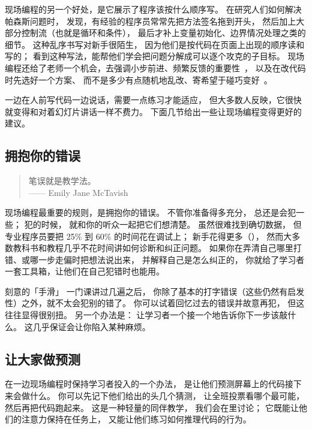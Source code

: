 现场编程的另一个好处，是它展示了程序该按什么顺序写。
在研究人们如何解决帕森斯问题时，
\cite{Ihan2011}发现，有经验的程序员常常先把方法签名拖到开头，
然后加上大部分控制流（也就是循环和条件），
最后才补上变量初始化、边界情况处理之类的细节。
这种乱序书写对新手很陌生，
因为他们是按代码在页面上出现的顺序读和写的；
看到这种写法，能帮他们学会把问题分解成可以逐个攻克的子目标。
现场编程还给了老师一个机会，去强调小步前进、频繁反馈的重要性~\cite{Blik2014}，
以及在改代码时先选好一个方案、
而不是多少有点随机地乱改、寄希望于碰巧变好~\cite{Spoh1985}。

一边在人前写代码一边说话，需要一点练习才能适应，
但大多数人反映，它很快就变得和对着幻灯片讲话一样不费力。
下面几节给出一些让现场编程变得更好的建议。

\subsection*{拥抱你的错误}

\begin{quote}

  笔误就是教学法。\\
  —— Emily Jane McTavish

\end{quote}

现场编程最重要的规则，是拥抱你的错误。
不管你准备得多充分，
总还是会犯一些；
犯的时候，
就和你的听众一起把它们想清楚。
虽然很难找到确切数据，
但专业程序员要把 25\% 到 60\% 的时间花在调试上；
新手花得更多（），
然而大多数教科书和教程几乎不花时间讲如何诊断和纠正问题。
如果你在弄清自己哪里打错、或哪一步走偏时把想法说出来，
并解释自己是怎么纠正的，
你就给了学习者一套工具箱，让他们在自己犯错时也能用。

\begin{aside}{刻意的「手滑」}
  一门课讲过几遍之后，
  你除了基本的打字错误（这些仍然有启发性）之外，就不太会犯别的错了。
  你可以试着回忆过去的错误并故意再犯，
  但这往往显得很别扭。
  另一个办法是：
  让学习者一个接一个地告诉你下一步该敲什么。
  这几乎保证会让你陷入某种麻烦。
\end{aside}

\subsection*{让大家做预测}

在一边现场编程时保持学习者投入的一个办法，
是让他们预测屏幕上的代码接下来会做什么。
你可以先记下他们给出的头几个猜测，
让全班投票看哪个最可能，
然后再把代码跑起来。
这是一种轻量的同伴教学，
我们会在里讨论；
它既能让他们的注意力保持在任务上，
又能让他们练习如何推理代码的行为。

